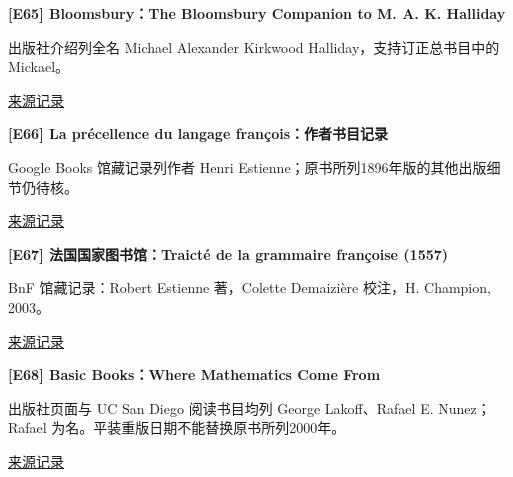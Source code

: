 \par\noindent\begin{minipage}{\linewidth}
\label{ref-65}\noindent\textbf{[E65] Bloomsbury：The Bloomsbury Companion to M. A. K. Halliday}\par\nobreak
出版社介绍列全名 Michael Alexander Kirkwood Halliday，支持订正总书目中的 Mickael。\par
{\small\href{https://www.bloomsbury.com/uk/bloomsbury-companion-to-m-a-k-halliday-9781350092501/}{来源记录}}\par
\par\end{minipage}\par

\par\noindent\begin{minipage}{\linewidth}
\label{ref-66}\noindent\textbf{[E66] La précellence du langage françois：作者书目记录}\par\nobreak
Google Books 馆藏记录列作者 Henri Estienne；原书所列1896年版的其他出版细节仍待核。\par
{\small\href{https://books.google.fr/books?id=HqoGAAAAQAAJ&printsec=frontcover}{来源记录}}\par
\par\end{minipage}\par

\par\noindent\begin{minipage}{\linewidth}
\label{ref-67}\noindent\textbf{[E67] 法国国家图书馆：Traicté de la grammaire françoise (1557)}\par\nobreak
BnF 馆藏记录：Robert Estienne 著，Colette Demaizière 校注，H. Champion, 2003。\par
{\small\href{https://catalogue.bnf.fr/ark%3A/12148/cb39007830f}{来源记录}}\par
\par\end{minipage}\par

\par\noindent\begin{minipage}{\linewidth}
\label{ref-68}\noindent\textbf{[E68] Basic Books：Where Mathematics Come From}\par\nobreak
出版社页面与 UC San Diego 阅读书目均列 George Lakoff、Rafael E. Nunez；Rafael 为名。平装重版日期不能替换原书所列2000年。\par
{\small\href{https://www.hachettebookgroup.com/titles/george-lakoff/where-mathematics-come-from/9780465037711/?lens=basic-books}{来源记录}}\par
\par\end{minipage}\par

